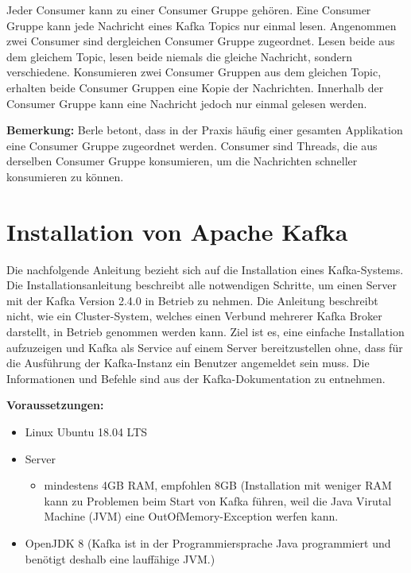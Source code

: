 \documentclass[a4paper,titlepage,halfparskip,12pt]{scrreprt}
\begin{document}
\begin{onehalfspacing}
Jeder Consumer kann zu einer Consumer Gruppe gehören. Eine Consumer Gruppe kann jede Nachricht eines Kafka Topics nur einmal lesen. Angenommen zwei Consumer sind dergleichen Consumer Gruppe zugeordnet. Lesen beide aus dem gleichem Topic, lesen beide niemals die gleiche Nachricht, sondern verschiedene. Konsumieren zwei Consumer Gruppen aus dem gleichen Topic, erhalten beide Consumer Gruppen eine Kopie der Nachrichten. Innerhalb der Consumer Gruppe kann eine Nachricht jedoch nur einmal gelesen werden.\cite{berleKafkaOverview, nannoniDissKafka}

\textbf{Bemerkung:} Berle \cite{berleKafkaOverview} betont, dass in der Praxis häufig einer gesamten Applikation eine Consumer Gruppe zugeordnet werden. Consumer sind Threads, die aus derselben Consumer Gruppe konsumieren, um die Nachrichten schneller konsumieren zu können.

\pagebreak

\section{Installation von Apache Kafka}
\label{sec:InstallationKafka}

Die nachfolgende Anleitung bezieht sich auf die Installation eines Kafka-Systems. Die Installationsanleitung beschreibt alle notwendigen Schritte, um einen Server mit der Kafka Version 2.4.0 in Betrieb zu nehmen. Die Anleitung beschreibt nicht, wie ein Cluster-System, welches einen Verbund mehrerer Kafka Broker darstellt, in Betrieb genommen werden kann. Ziel ist es, eine einfache Installation aufzuzeigen und Kafka als Service auf einem Server bereitzustellen ohne, dass für die Ausführung der Kafka-Instanz ein Benutzer angemeldet sein muss. Die Informationen und Befehle sind aus der Kafka-Dokumentation \cite{kafkaDoc} zu entnehmen.

\bigskip

\textbf{Voraussetzungen:}

\smallskip

\begin{itemize}
\item Linux Ubuntu 18.04 LTS
\item Server
\begin{itemize}
\item mindestens 4GB RAM, empfohlen 8GB (Installation mit weniger RAM kann zu Problemen beim Start von Kafka führen, weil die Java Virutal Machine (JVM) eine \glqq OutOfMemory\grqq -Exception werfen kann.
\end{itemize}
\item OpenJDK 8 (Kafka ist in der Programmiersprache Java programmiert und benötigt deshalb eine lauffähige JVM.)
\end{itemize}


\end{onehalfspacing}
\end{document}
